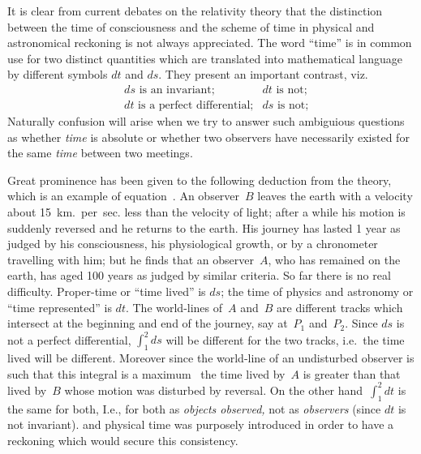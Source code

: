 \documentclass[12pt]{book}
\begin{document}
It is clear from current debates on the relativity theory that the distinction between the
time of consciousness and the scheme of time in physical and astronomical reckoning is not
always appreciated.
The word ``time'' is in common use for two distinct quantities which are translated into
mathematical language by different symbols $dt$ and $ds$.
They present an important contrast, viz.
\begin{align*}
&\text{$ds$ is an invariant;} & \text{$dt$ is not;}\\
&\text{$dt$ is a perfect differential;} & \text{$ds$ is not;}
\end{align*}
Naturally confusion will arise when we try to answer such ambiguious questions as whether
\emph{time} is absolute or whether two observers have necessarily existed for the same \emph{time}
between two meetings.

Great prominence has been given to the following deduction from the theory, which is an example
of equation~.
An observer~$B$ leaves the earth with a velocity about 15~km.\ per~sec. less than the velocity of light;
after a while his motion is suddenly reversed and he returns to the earth.
His journey has lasted 1 year as judged by his consciousness, his physiological growth, or by a chronometer
travelling with him; but he finds that an observer~$A$, who has remained on the earth, has aged 100 years
as judged by similar criteria.
So far there is no real difficulty.
Proper\hyp{}time or ``time lived'' is $ds$; the time of physics and astronomy or ``time represented'' is $dt$.
The world-lines of~$A$ and~$B$ are different tracks which intersect at the beginning and end of the journey,
say at~$P_1$ and~$P_2$.
Since $ds$ is not a perfect differential, $\int_1^2 ds$ will be different for the two tracks, i.e.\ the time
lived will be different.
Moreover since the world-line of an undisturbed observer is such that this integral is a maximum~
the time lived by~$A$ is greater than that lived by~$B$ whose motion was disturbed by reversal.
On the other hand~$\int_1^2 dt$ is the same for
both\footnotemark,\footnotetext
    {I.e., for both as \emph{objects observed,} not as \emph{observers} (since $dt$ is not invariant).}
and physical time was purposely introduced in order to have a reckoning which would secure this
consistency.
\end{document}
